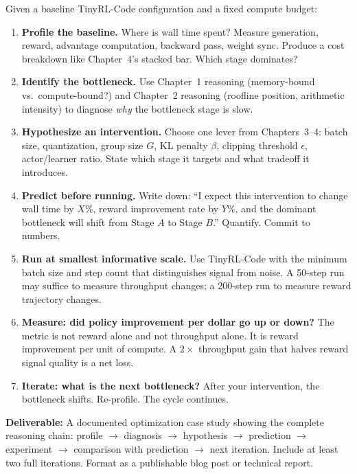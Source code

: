 \begin{portfolio}
Given a baseline TinyRL-Code configuration and a fixed compute budget:

\begin{enumerate}
  \item \textbf{Profile the baseline.} Where is wall time spent? Measure generation, reward, advantage computation, backward pass, weight sync. Produce a cost breakdown like Chapter~4's stacked bar. Which stage dominates?

  \item \textbf{Identify the bottleneck.} Use Chapter~1 reasoning (memory-bound vs.\ compute-bound?) and Chapter~2 reasoning (roofline position, arithmetic intensity) to diagnose \textit{why} the bottleneck stage is slow.

  \item \textbf{Hypothesize an intervention.} Choose one lever from Chapters~3--4: batch size, quantization, group size $G$, KL penalty $\beta$, clipping threshold $\epsilon$, actor/learner ratio. State which stage it targets and what tradeoff it introduces.

  \item \textbf{Predict before running.} Write down: ``I expect this intervention to change wall time by $X$\%, reward improvement rate by $Y$\%, and the dominant bottleneck will shift from Stage $A$ to Stage $B$.'' Quantify. Commit to numbers.

  \item \textbf{Run at smallest informative scale.} Use TinyRL-Code with the minimum batch size and step count that distinguishes signal from noise. A 50-step run may suffice to measure throughput changes; a 200-step run to measure reward trajectory changes.

  \item \textbf{Measure: did policy improvement per dollar go up or down?} The metric is not reward alone and not throughput alone. It is reward improvement per unit of compute. A $2\times$ throughput gain that halves reward signal quality is a net loss.

  \item \textbf{Iterate: what is the next bottleneck?} After your intervention, the bottleneck shifts. Re-profile. The cycle continues.
\end{enumerate}

\textbf{Deliverable:} A documented optimization case study showing the complete reasoning chain: profile $\to$ diagnosis $\to$ hypothesis $\to$ prediction $\to$ experiment $\to$ comparison with prediction $\to$ next iteration. Include at least two full iterations. Format as a publishable blog post or technical report.


\end{portfolio}
